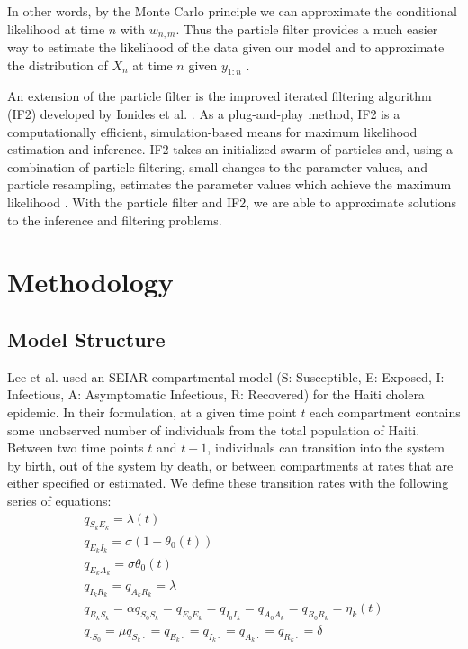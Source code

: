 \documentclass[12pt]{article}
\begin{document}
    In other words, by the Monte Carlo principle we can approximate the conditional likelihood at time $n$ with $w_{n,m}$. Thus the particle filter provides a much easier way to estimate the likelihood of the data given our model and to approximate the distribution of $X_{n}$ at time $n$ given $y_{1:n}$ \cite{King_statinfpomp, Ionides_infpomp, Ionides_if}.
  
  An extension of the particle filter is the improved iterated filtering algorithm (IF2) developed by Ionides et al. \cite{Ionides_infdynsys}. As a plug-and-play method, IF2 is a computationally efficient, simulation-based means for maximum likelihood estimation and inference. IF2 takes an initialized swarm of particles and, using a combination of particle filtering, small changes to the parameter values, and particle resampling, estimates the parameter values which achieve the maximum likelihood \cite{Ionides_infpomp}. With the particle filter and IF2, we are able to approximate solutions to the inference and filtering problems. 
  
\section{Methodology}
\subsection{Model Structure}

 Lee et al. used an SEIAR compartmental model (S: Susceptible, E: Exposed, I: Infectious, A: Asymptomatic Infectious, R: Recovered) for the Haiti cholera epidemic. In their formulation, at a given time point $t$ each compartment contains some unobserved number of individuals from the total population of Haiti. Between two time points $t$ and $t+1$, individuals can transition into the system by birth, out of the system by death, or between compartments at rates that are either specified or estimated. We define these transition rates with the following series of equations:
        \begin{eqnarray}
        \label{SE}
        q_{S_kE_k} = \lambda(t)
        \\
        \label{EI}
        q_{E_kI_k} = \sigma(1 - \theta_0(t))
        \\
        \label{EA}
        q_{E_kA_k} = \sigma\theta_0(t)
        \\
        \label{IR AR}
        q_{I_kR_k} = q_{A_kR_k} = \lambda
        \\
        \label{RS}
        q_{R_kS_k} = \alpha
        \label{vacc}
        q_{S_0S_k} = q_{E_0E_k} = q_{I_0I_k} = q_{A_0A_k} = q_{R_0R_k} = \eta_k(t)
        \\
        \label{birth}
        q_{\cdot S_0} = \mu
        \label{death}
        q_{S_k \cdot} = q_{E_k \cdot} = q_{I_k \cdot} = q_{A_k \cdot} = q_{R_k \cdot} = \delta
        \end{eqnarray}
        
\end{document}
